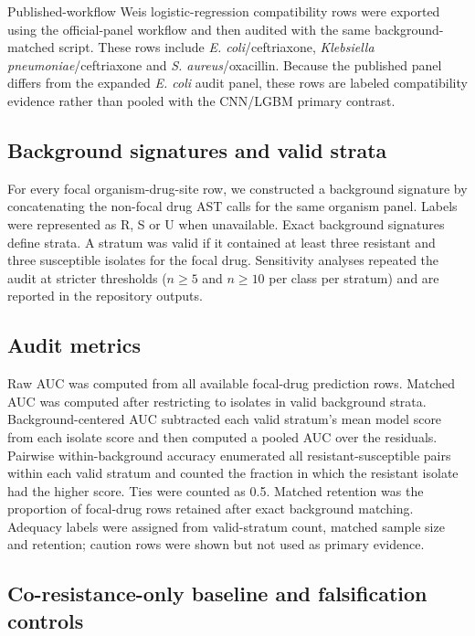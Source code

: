 \documentclass[11pt]{article}
\begin{document}
Published-workflow Weis logistic-regression compatibility rows were exported using the official-panel workflow and then audited with the same background-matched script. These rows include \textit{E. coli}/ceftriaxone, \textit{Klebsiella pneumoniae}/ceftriaxone and \textit{S. aureus}/oxacillin. Because the published panel differs from the expanded \textit{E. coli} audit panel, these rows are labeled compatibility evidence rather than pooled with the CNN/LGBM primary contrast.

\subsection*{Background signatures and valid strata}

For every focal organism-drug-site row, we constructed a background signature by concatenating the non-focal drug AST calls for the same organism panel. Labels were represented as R, S or U when unavailable. Exact background signatures define strata. A stratum was valid if it contained at least three resistant and three susceptible isolates for the focal drug. Sensitivity analyses repeated the audit at stricter thresholds ($n\geq5$ and $n\geq10$ per class per stratum) and are reported in the repository outputs.

\subsection*{Audit metrics}

Raw AUC was computed from all available focal-drug prediction rows. Matched AUC was computed after restricting to isolates in valid background strata. Background-centered AUC subtracted each valid stratum's mean model score from each isolate score and then computed a pooled AUC over the residuals. Pairwise within-background accuracy enumerated all resistant-susceptible pairs within each valid stratum and counted the fraction in which the resistant isolate had the higher score. Ties were counted as 0.5. Matched retention was the proportion of focal-drug rows retained after exact background matching. Adequacy labels were assigned from valid-stratum count, matched sample size and retention; caution rows were shown but not used as primary evidence.

\subsection*{Co-resistance-only baseline and falsification controls}
\end{document}
